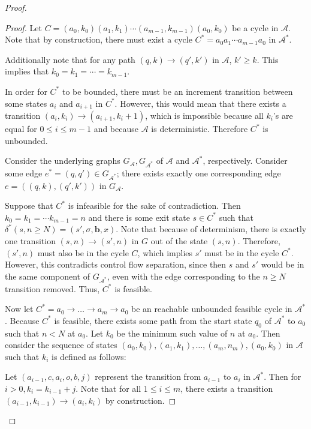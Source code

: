 \documentclass[12pt]{article}
\theoremstyle{definition}
\begin{document}
\begin{proof}
\begin{proof}
	Let $C = (a_0, k_0)(a_1, k_1)\cdots (a_{m-1}, k_{m-1})(a_0, k_0)$ be a cycle in $\mathcal{A}$. Note that by construction, there must exist a cycle $C^*=a_0a_1\cdots a_{m-1}a_0$ in $\mathcal{A}^*$.

	Additionally note that for any path $(q, k) \to (q', k')$ in $\mathcal{A}$, $k' \geq k$. This implies that $k_0 = k_1 = \cdots = k_{m-1}$. 

	In order for $C^*$ to be bounded, there must be an increment transition between some states $a_i$ and $a_{i+1}$ in $C^*$. However, this would mean that there exists a transition  $(a_i, k_i)\to (a_{i+1}, k_i + 1)$, which is impossible because all $k_i$'s are equal for $ 0\leq i \leq m-1$ and because $\mathcal{A}$ is deterministic. Therefore $C^*$ is unbounded.

	Consider the underlying graphs $G_\mathcal{A}, G_{\mathcal{A}^*}$ of $\mathcal{A}$ and $\mathcal{A}^*$, respectively. Consider some edge $e^* = (q, q')\in G_{\mathcal{A}^*}$; there exists exactly one corresponding edge $e = ((q, k), (q', k'))$ in $G_{\mathcal{A}}$.

	Suppose that $C^*$ is infeasible for the sake of contradiction. Then $k_0 = k_1 = \cdots k_{m-1} = n$ and there is some exit state $s\in C^*$ such that $\delta^*(s, n\geq N) = (s', \sigma, \mathbf{b}, x)$. Note that because of determinism, there is exactly one transition $(s, n)\to (s', n)$ in $G$ out of the state $(s, n)$. 
	Therefore, $(s', n)$ must also be in the cycle $C$, which implies $s'$ must be in the cycle $C^*$. However, this contradicts control flow separation, since then $s$ and $s'$ would be in the same component of $G_{\mathcal{A}^*}$, even with the edge corresponding to the $n\geq N$ transition removed. Thus, $C^*$ is feasible.

	Now let $C^* = a_0 \to \ldots \to a_m \to a_0$ be an reachable unbounded feasible cycle in $\mathcal{A}^*$. Because $C^*$ is feasible, there exists some path from the start state $q_0$ of $\mathcal{A}^*$ to $a_0$ such that $n < N$ at $a_0$. Let $k_0$ be the minimum such value of $n$ at $a_0$. Then consider the sequence of states $(a_0, k_0), (a_1, k_1), \ldots, (a_m, n_m), (a_0, k_0)$ in $\mathcal{A}$ such that $k_i$ is defined as follows:

	Let $(a_{i-1}, c, a_i, o, b, j)$ represent the transition from $a_{i-1}$ to $a_i$ in $\mathcal{A}^*$. Then for $i > 0, k_i = k_{i-1} + j$. Note that for all $1 \leq i\leq m$, there exists a transition $(a_{i-1}, k_{i-1}) \to (a_i, k_i)$ by construction.


\end{proof}
\end{proof}
\end{document}
